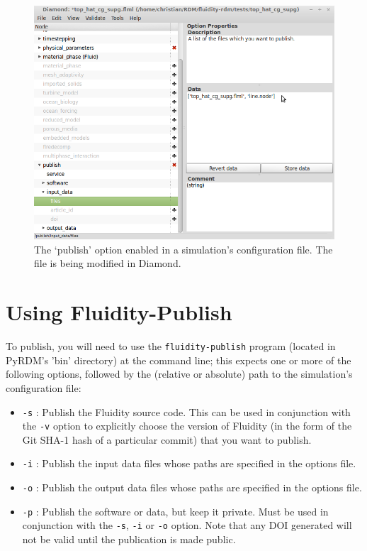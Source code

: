 \documentclass[a4paper,11pt]{report}
\begin{document}
\begin{figure}
  \centering
  \includegraphics[width=1\columnwidth]{images/diamond.png}
  \caption{The `publish' option enabled in a simulation's configuration file. The file is being modified in Diamond.}
  \label{fig:diamond}
\end{figure}

\section{Using Fluidity-Publish}
To publish, you will need to use the \texttt{fluidity-publish} program (located in PyRDM's 'bin' directory) at the command line; this expects one or more of the following options, followed by the (relative or absolute) path to the simulation's configuration file:
\begin{itemize}
   \item \texttt{-s} : Publish the Fluidity source code. This can be used in conjunction with the \texttt{-v} option to explicitly choose the version of Fluidity (in the form of the Git SHA-1 hash of a particular commit) that you want to publish.
   \item \texttt{-i} : Publish the input data files whose paths are specified in the options file.
   \item \texttt{-o} : Publish the output data files whose paths are specified in the options file.
   \item \texttt{-p} : Publish the software or data, but keep it private. Must be used in conjunction with the \texttt{-s}, \texttt{-i} or \texttt{-o} option. Note that any DOI generated will not be valid until the publication is made public.
\end{itemize}
\end{document}
